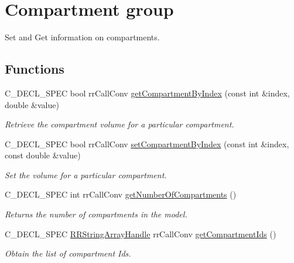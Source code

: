 \hypertarget{group__compartment}{
\section{\-Compartment group}
\label{group__compartment}
}


\-Set and \-Get information on compartments.  


\subsection*{\-Functions}
\begin{DoxyCompactItemize}
\item 
\-C\-\_\-\-D\-E\-C\-L\-\_\-\-S\-P\-E\-C bool rr\-Call\-Conv \hyperlink{group__compartment_ga5241b915cff8bcabba3024c33fb4e336}{get\-Compartment\-By\-Index} (const int \&index, double \&value)
\begin{DoxyCompactList}\small\item\em \-Retrieve the compartment volume for a particular compartment. \end{DoxyCompactList}\item 
\-C\-\_\-\-D\-E\-C\-L\-\_\-\-S\-P\-E\-C bool rr\-Call\-Conv \hyperlink{group__compartment_gadb238a943d93bc9548bf5c3cd452e9bb}{set\-Compartment\-By\-Index} (const int \&index, const double \&value)
\begin{DoxyCompactList}\small\item\em \-Set the volume for a particular compartment. \end{DoxyCompactList}\item 
\hypertarget{group__compartment_ga5ea2479b882549edd4fb75397ca38f52}{
\-C\-\_\-\-D\-E\-C\-L\-\_\-\-S\-P\-E\-C int rr\-Call\-Conv \hyperlink{group__compartment_ga5ea2479b882549edd4fb75397ca38f52}{get\-Number\-Of\-Compartments} ()}
\label{group__compartment_ga5ea2479b882549edd4fb75397ca38f52}

\begin{DoxyCompactList}\small\item\em \-Returns the number of compartments in the model. \end{DoxyCompactList}\item 
\-C\-\_\-\-D\-E\-C\-L\-\_\-\-S\-P\-E\-C \*
\hyperlink{rr__c__types_8h_a90941a6a2247bf7a8ec3d429729c5f9a}{\-R\-R\-String\-Array\-Handle} rr\-Call\-Conv \hyperlink{group__compartment_ga92973e041d56fd9211fa9f13f1dd7062}{get\-Compartment\-Ids} ()
\begin{DoxyCompactList}\small\item\em \-Obtain the list of compartment \-Ids. \end{DoxyCompactList}\end{DoxyCompactItemize}


